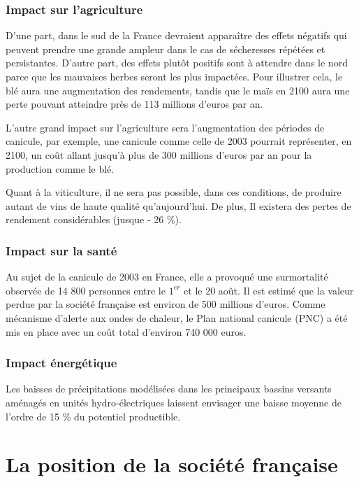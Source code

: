 \documentclass[a4paper,10pt]{article}
\begin{document}
\subsubsection*{Impact sur l’agriculture}
D’une  part, dans  le sud  de  la France  devra{\color{red}ient} apparaître  des
effets  négatifs  qui  peuvent  prendre  une  grande  ampleur  dans  le  cas  de
sécheresses répétées  et persistantes. D’autre part, des  effets plutôt positifs
sont à  attendre dans  le nord parce  que les  mauvaises herbes seront  les plus
impactées.  Pour illustrer cela, le blé aura une augmentation des rendements, tandis que le maïs en 2100 aura une perte pouvant atteindre près de 113 millions d’euros par an.

{\color{red}L'autre}  grand  impact  sur  l'agriculture  sera l'augmentation  des  périodes  de canicule, par exemple,  une canicule comme celle {\color{red}de}  2003 pourrait représenter, en 2100,  un coût  allant jusqu’à  plus de  300 millions  d’euros par  an  pour la production comme le blé.  

Quant à la viticulture, il ne sera pas possible, dans ces conditions, de produire autant de vins de haute qualité qu’aujourd’hui. De plus, Il existera des pertes de rendement considérables (jusque - 26 \%).

\subsubsection*{Impact sur la santé }
{\color{red}Au} sujet de la canicule de 2003 en France, elle a provoqué une surmortalité observée de 14 800
personnes entre le $1^{er}$ et le 20 août.  Il est estimé que la valeur perdue par la société française est environ de 500 millions d’euros.
Comme mécanisme d'alerte aux ondes de chaleur, le Plan national canicule (PNC) a été mis en place avec un coût total d'environ 740 000 euros. 

\subsubsection*{Impact énergétique}

Les baisses de précipitations modélisées dans les principaux bassins versants aménagés en unités hydro-électriques laissent envisager une baisse moyenne de l’ordre de 15 \% du potentiel productible.

\section{La position de la société française}
\end{document}
